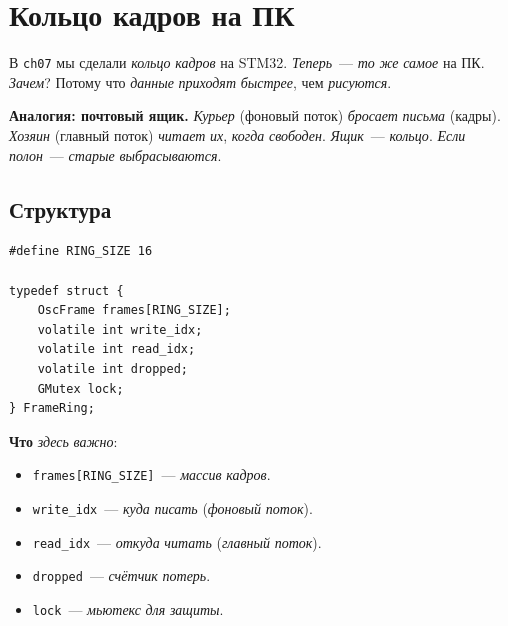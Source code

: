 


\section{Кольцо кадров на ПК}
\label{sec:pc-ring}

В \texttt{ch07} мы сделали \emph{кольцо} \emph{кадров} на
STM32. \emph{Теперь}~--- \emph{то} \emph{же} \emph{самое} на ПК.
\emph{Зачем}? Потому что \emph{данные} \emph{приходят} \emph{быстрее},
чем \emph{рисуются}.

\begin{ideabox}
\textbf{Аналогия: почтовый ящик.} \emph{Курьер} (фоновый поток)
\emph{бросает} \emph{письма} (кадры). \emph{Хозяин} (главный поток)
\emph{читает} \emph{их}, \emph{когда} \emph{свободен}.
\emph{Ящик}~--- \emph{кольцо}. \emph{Если} \emph{полон}~---
\emph{старые} \emph{выбрасываются}.
\end{ideabox}

\subsection{Структура}

\begin{listing}[htbp]
\begin{verbatim}
#define RING_SIZE 16

typedef struct {
    OscFrame frames[RING_SIZE];
    volatile int write_idx;
    volatile int read_idx;
    volatile int dropped;
    GMutex lock;
} FrameRing;
\end{verbatim}
\caption{Кольцо кадров на ПК}
\label{lst:pc-ring-struct}
\end{listing}

\textbf{Что} \emph{здесь} \emph{важно}:
\begin{itemize}
    \item \texttt{frames[RING\_SIZE]}~--- \emph{массив} \emph{кадров}.
    \item \texttt{write\_idx}~--- \emph{куда} \emph{писать}
          (\emph{фоновый} \emph{поток}).
    \item \texttt{read\_idx}~--- \emph{откуда} \emph{читать}
          (\emph{главный} \emph{поток}).
    \item \texttt{dropped}~--- \emph{счётчик} \emph{потерь}.
    \item \texttt{lock}~--- \emph{мьютекс} \emph{для}
          \emph{защиты}.
\end{itemize}


